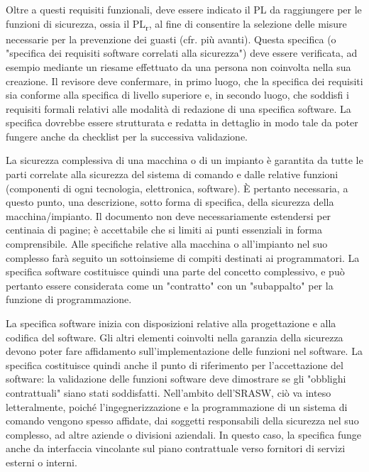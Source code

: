 Oltre a questi requisiti funzionali, deve essere indicato il PL da raggiungere per le funzioni di sicurezza, ossia il PL\textsubscript{r}, al fine di consentire la selezione delle misure necessarie per la prevenzione dei guasti (cfr. più avanti).
Questa specifica (o "specifica dei requisiti software correlati alla sicurezza") deve essere verificata, ad esempio mediante un riesame effettuato da una persona non coinvolta nella sua creazione. Il revisore deve confermare, in primo luogo, che la specifica dei requisiti sia conforme alla specifica di livello superiore e, in secondo luogo, che soddisfi i requisiti formali relativi alle modalità di redazione di una specifica software. La specifica dovrebbe essere strutturata e redatta in dettaglio in modo tale da poter fungere anche da checklist per la successiva validazione.

La sicurezza complessiva di una macchina o di un impianto è garantita da tutte le parti correlate alla sicurezza del sistema di comando e dalle relative funzioni (componenti di ogni tecnologia, elettronica, software). È pertanto necessaria, a questo punto, una descrizione, sotto forma di specifica, della sicurezza della macchina/impianto. Il documento non deve necessariamente estendersi per centinaia di pagine; è accettabile che si limiti ai punti essenziali in forma comprensibile. Alle specifiche relative alla macchina o all'impianto nel suo complesso farà seguito un sottoinsieme di compiti destinati ai programmatori. La specifica software costituisce quindi una parte del concetto complessivo, e può pertanto essere considerata come un "contratto" con un "subappalto" per la funzione di programmazione.

La specifica software inizia con disposizioni relative alla progettazione e alla codifica del software. Gli altri elementi coinvolti nella garanzia della sicurezza devono poter fare affidamento sull'implementazione delle funzioni nel software. La specifica costituisce quindi anche il punto di riferimento per l'accettazione del software: la validazione delle funzioni software deve dimostrare se gli "obblighi contrattuali" siano stati soddisfatti. Nell'ambito dell'SRASW, ciò va inteso letteralmente, poiché l'ingegnerizzazione e la programmazione di un sistema di comando vengono spesso affidate, dai soggetti responsabili della sicurezza nel suo complesso, ad altre aziende o divisioni aziendali. In questo caso, la specifica funge anche da interfaccia vincolante sul piano contrattuale verso fornitori di servizi esterni o interni.

